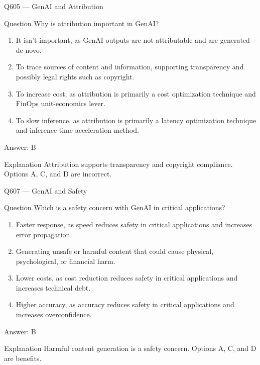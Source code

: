 \documentclass[aspectratio=169,8pt]{beamer}
\begin{document}
	\begin{frame}{Q605 --- GenAI and Attribution}
		\begin{block}{Question}
			Why is attribution important in GenAI?
			\begin{enumerate}
				\item It isn't important, as GenAI outputs are not attributable and are generated de novo.
				\item To trace sources of content and information, supporting transparency and possibly legal rights such as copyright.
				\item To increase cost, as attribution is primarily a cost optimization technique and FinOps unit-economics lever.
				\item To slow inference, as attribution is primarily a latency optimization technique and inference-time acceleration method.
			\end{enumerate}
		\end{block}
		\begin{exampleblock}{Answer: B}\end{exampleblock}
		\begin{block}{Explanation}
			Attribution supports transparency and copyright compliance. Options A, C, and D are incorrect.
		\end{block}
	\end{frame}
	

	
	\begin{frame}{Q607 --- GenAI and Safety}
		\begin{block}{Question}
			Which is a safety concern with GenAI in critical applications?
			\begin{enumerate}
				\item Faster response, as speed reduces safety in critical applications and increases error propagation.
				\item Generating unsafe or harmful content that could cause physical, psychological, or financial harm.
				\item Lower costs, as cost reduction reduces safety in critical applications and increases technical debt.
				\item Higher accuracy, as accuracy reduces safety in critical applications and increases overconfidence.
			\end{enumerate}
		\end{block}
		\begin{exampleblock}{Answer: B}\end{exampleblock}
		\begin{block}{Explanation}
			Harmful content generation is a safety concern. Options A, C, and D are benefits.
		\end{block}
	\end{frame}
	
\end{document}
